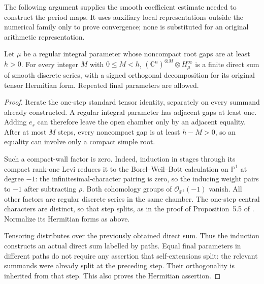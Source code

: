 The following argument supplies the smooth coefficient estimate needed
to construct the period maps. It uses auxiliary local representations
outside the numerical family only to prove convergence; none is
substituted for an original arithmetic representation.

\begin{lemma}\label{original-stable-tensor-power}
Let $\mu$ be a regular integral parameter whose noncompact root
gaps are at least $h>0$. For every integer $M$ with $0\le M<h$,
$(\mathbb C^n)^{\otimes M}\otimes H_\mu^\infty$ is a finite
direct sum of smooth discrete series, with a signed orthogonal
decomposition for its original tensor Hermitian form.
Repeated final parameters are allowed.
\end{lemma}
\begin{proof}
Iterate the one-step standard tensor identity, separately on every
summand already constructed. A regular integral parameter has
adjacent gaps at least one. Adding $e_s$ can therefore leave the
open chamber only by an adjacent equality. After at most $M$
steps, every noncompact gap is at least $h-M>0$, so an equality
can involve only a compact simple root.

Such a compact-wall factor is zero. Indeed, induction in stages
through its compact rank-one Levi reduces it to the
Borel--Weil--Bott calculation on $\mathbb P^1$ at degree $-1$:
the infinitesimal-character pairing is zero, so the inducing
weight pairs to $-1$ after subtracting $\rho$.
Both cohomology groups of $\mathcal O_{\mathbb P^1}(-1)$ vanish.
All other factors are regular discrete series in the same chamber.
The one-step central characters are distinct, so that step splits,
as in the proof of Proposition~5.5 of
\cite{pieri-family-hks}. Normalize its Hermitian forms as above.

Tensoring distributes over the previously obtained direct sum.
Thus the induction constructs an actual direct sum labelled by
paths. Equal final parameters in different paths do not require
any assertion that self-extensions split: the relevant summands
were already split at the preceding step. Their orthogonality is
inherited from that step. This also proves the Hermitian assertion.
\end{proof}

